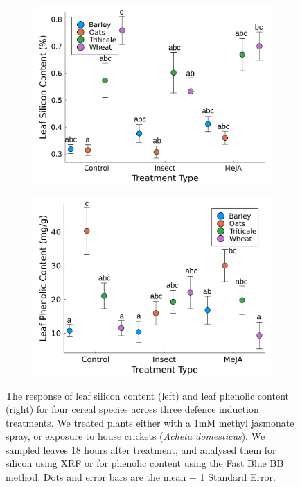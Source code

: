 \documentclass[12pt, letterpaper]{report}
\begin{document}
\begin{figure}[ht]
        \centering
        \begin{subfigure}[b]{0.7\textwidth}
                \centering
                \includegraphics[width = \textwidth]{images/induction_plot_letters.png}
        \end{subfigure}



        \begin{subfigure}[b]{0.70\textwidth}
                \centering
                \includegraphics[width = \textwidth]{images/phenolic_induction_plot_letters.png}
        \end{subfigure}
        \caption{The response of leaf silicon content (left) and leaf phenolic content (right) for four cereal species across three defence induction treatments. We treated plants either with a 1mM methyl jasmonate spray, or exposure to house crickets (\textit{Acheta domesticus}). We sampled leaves 18 hours after treatment, and analysed them for silicon using XRF or for phenolic content using the Fast Blue BB method. Dots and error bars are the mean $\pm$ 1 Standard Error.}
        \label{Fig:induction_by_spp}
\end{figure}
\end{document}

